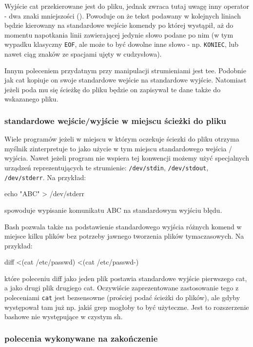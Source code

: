 Wyjście cat przekierowane jest do pliku, jednak zwraca tutaj uwagę inny operator - dwa znaki mniejszości (\shell{<<}).
Powoduje on że tekst podawany w kolejnych liniach będzie kierowany na standardowe wejście komendy po której wystąpił,
	aż do momentu napotkania linii zawierającej jedynie słowo podane po nim (w tym wypadku klasyczny \texttt{EOF}, ale może to być dowolne inne słowo - np. \texttt{KONIEC}, lub nawet ciąg znaków ze spacjami ujęty w cudzysłowa).

Innym poleceniem przydatnym przy manipulacji strumieniami jest tee.
Podobnie jak cat kopiuje on swoje standardowe wejście na standardowe wyjście.
Natomiast jeżeli poda mu się ścieżkę do pliku będzie on zapisywał te dane także do wskazanego pliku.

\subsubsection{standardowe wejście/wyjście w miejscu ścieżki do pliku}

Wiele programów jeżeli w miejscu w którym oczekuje ściezki do pliku otrzyma myślnik zinterpretuje to jako użycie w tym miejscu standardowego wejścia / wyjścia. Nawet jeżeli program nie wspiera tej konwencji możemy użyć specjalnych urządzeń reprezentujących te strumienie: \texttt{/dev/stdin}, \texttt{/dev/stdout}, \texttt{/dev/stderr}. Na przykład:

\begin{CodeFrame*}[bash]{}
echo "ABC" > /dev/stderr
\end{CodeFrame*}

\noindent
spowoduje wypisanie komunikatu ABC na standardowym wyjściu błędu.

Bash pozwala także na podstawienie standardowego wyjścia różnych komend w miejsce kilku plików bez potrzeby jawnego tworzenia plików tymaczasowych. Na przykład:

\begin{CodeFrame*}[bash]{}
diff <(cat /etc/passwd) <(cat /etc/passwd-)
\end{CodeFrame*}

\noindent
które poleceniu diff jako jeden plik postawia standardowe wyjście pierwszego cat, a jako drugi plik drugiego cat.
Oczywiście zaprezentowane zastosowanie tego z poleceniami \texttt{cat} jest bezsensowne (prościej podać ścieżki do plików),
	ale gdyby występował tam już np. jakiś grep mogłoby to być użyteczne.
Jest to rozszerzenie bashowe nie występujące w czystym sh.

\subsubsection{polecenia wykonywane na zakończenie}


